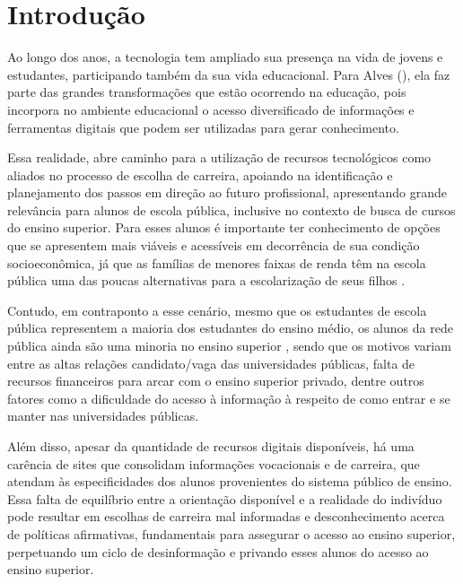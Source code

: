 \chapter{Introdução}
Ao longo dos anos, a tecnologia tem ampliado sua presença na vida de jovens e estudantes, participando também da sua vida educacional. Para Alves (\citeyear{alves2022tecnologia}), ela faz parte das grandes transformações que estão ocorrendo na educação, pois incorpora no ambiente educacional o acesso diversificado de informações e ferramentas digitais que podem ser utilizadas para gerar conhecimento. 

Essa realidade, abre caminho para a utilização de recursos tecnológicos como aliados no processo de escolha de carreira, apoiando na identificação e planejamento dos passos em direção ao futuro profissional, apresentando grande relevância para alunos de escola pública, inclusive no contexto de busca de cursos do ensino superior. Para esses alunos é importante ter conhecimento de opções que se apresentem mais viáveis e acessíveis em decorrência de sua condição socioeconômica, já que as famílias de menores faixas de renda têm na escola pública uma das poucas alternativas para a escolarização de seus filhos \cite{matos2012impacto}.

Contudo, em contraponto a esse cenário, mesmo que os estudantes de escola pública representem a maioria dos estudantes do ensino médio, os alunos da rede pública ainda são uma minoria no ensino superior \cite{alvarenga2012desafios}, sendo que os motivos variam entre as altas relações candidato/vaga das universidades públicas, falta de recursos financeiros para arcar com o ensino superior privado, dentre outros fatores como a dificuldade do acesso à informação à respeito de como entrar e se manter nas universidades públicas.

Além disso, apesar da quantidade de recursos digitais disponíveis, há uma carência de sites que consolidam informações vocacionais e de carreira, que atendam às especificidades dos alunos provenientes do sistema público de ensino. Essa falta de equilíbrio entre a orientação disponível e a realidade do indivíduo pode resultar em escolhas de carreira mal informadas e desconhecimento acerca de políticas afirmativas, fundamentais para assegurar o acesso ao ensino superior, perpetuando um ciclo de desinformação e  privando esses alunos do acesso ao ensino superior.

